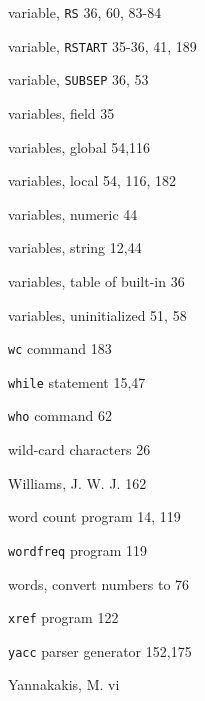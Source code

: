 \begin{multicols}{3}
\hangindent=3pc  variable, \verb'RS' 36, 60, 83-84

\hangindent=3pc  variable, \verb'RSTART' 35-36, 41, 189

\hangindent=3pc  variable, \verb'SUBSEP' 36, 53

\hangindent=3pc  variables, field 35

\hangindent=3pc  variables, global 54,116

\hangindent=3pc  variables, local 54, 116, 182

\hangindent=3pc  variables, numeric 44

\hangindent=3pc  variables, string 12,44

\hangindent=3pc  variables, table of built-in 36

\hangindent=3pc  variables, uninitialized 51, 58

\hangindent=3pc  \verb'wc' command 183

\hangindent=3pc  \verb'while' statement 15,47

\hangindent=3pc  \verb'who' command 62

\hangindent=3pc  wild-card characters 26

\hangindent=3pc  Williams, J. W. J. 162

\hangindent=3pc  word count program 14, 119

\hangindent=3pc  \verb'wordfreq' program 119

\hangindent=3pc  words, convert numbers to 76

\hangindent=3pc  \verb'xref' program 122

\hangindent=3pc  \verb'yacc' parser generator 152,175

\hangindent=3pc  Yannakakis, M. vi

\end{multicols}
